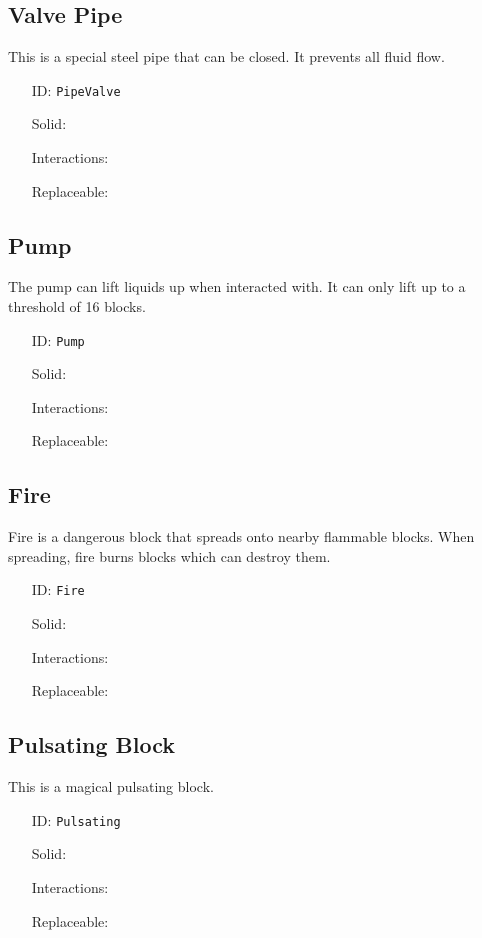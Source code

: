 \subsection{Valve Pipe}\label{subsec:blocks_valve pipe}
This is a special steel pipe that can be closed. It prevents all fluid flow.
\newline
\begin{itemize}[nosep]
    \item[ID:] \texttt{PipeValve}
    \item[Solid:]  \Checkmark \item[Interactions:]  \Checkmark \item[Replaceable:]  \XSolidBrush
\end{itemize}

\subsection{Pump}\label{subsec:blocks_pump}
The pump can lift liquids up when interacted with.
It can only lift up to a threshold of 16 blocks.
\newline
\begin{itemize}[nosep]
    \item[ID:] \texttt{Pump}
    \item[Solid:]  \Checkmark \item[Interactions:]  \Checkmark \item[Replaceable:]  \XSolidBrush
\end{itemize}

\subsection{Fire}\label{subsec:blocks_fire}
Fire is a dangerous block that spreads onto nearby flammable blocks.
When spreading, fire burns blocks which can destroy them.
\newline
\begin{itemize}[nosep]
    \item[ID:] \texttt{Fire}
    \item[Solid:]  \XSolidBrush \item[Interactions:]  \XSolidBrush \item[Replaceable:]  \Checkmark
\end{itemize}

\subsection{Pulsating Block}\label{subsec:blocks_pulsating block}
This is a magical pulsating block.
\newline
\begin{itemize}[nosep]
    \item[ID:] \texttt{Pulsating}
    \item[Solid:]  \Checkmark \item[Interactions:]  \Checkmark \item[Replaceable:]  \XSolidBrush
\end{itemize}


